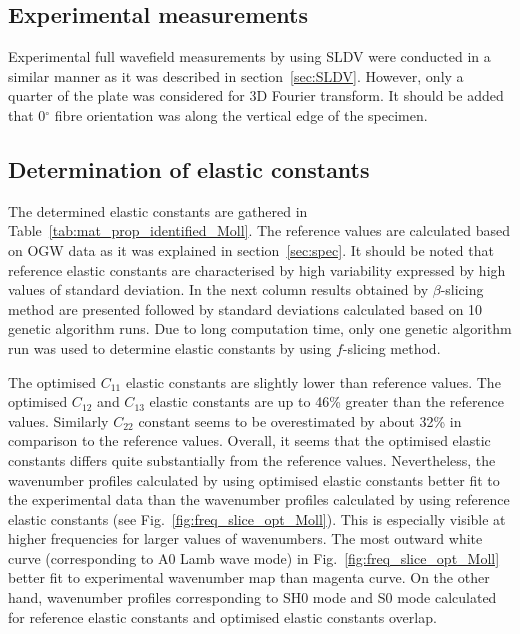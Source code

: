 \documentclass[preprint,12pt]{elsarticle}
\begin{document}
\subsection{Experimental measurements}
Experimental full wavefield measurements by using SLDV were conducted in a similar manner as it was described in section~\ref{sec:SLDV}. 
However, only a quarter of the plate was considered for 3D Fourier transform.
It should be added that 0\(^{\circ}\) fibre orientation was along the vertical edge of the specimen.
\subsection{Determination of elastic constants}
The determined elastic constants are gathered in Table~\ref{tab:mat_prop_identified_Moll}.
The reference values are calculated based on OGW data as it was explained in section~\ref{sec:spec}.
It should be noted that reference elastic constants are characterised by high variability expressed by high values of standard deviation.
In the next column results obtained by $\beta$-slicing method are presented followed by standard deviations calculated based on 10 genetic algorithm runs.
Due to long computation time, only one genetic algorithm run was used to determine elastic constants by using $f$-slicing method.

The optimised $C_{11}$ elastic constants are slightly lower than reference values.
The optimised $C_{12}$ and $C_{13}$ elastic constants are up to 46\% greater than the reference values.
Similarly $C_{22}$ constant seems to be overestimated by about 32\% in comparison to the reference values.
Overall, it seems that the optimised elastic constants differs quite substantially from the reference values.
Nevertheless, the wavenumber profiles calculated by using optimised elastic constants better fit to the experimental data than the wavenumber profiles calculated by using reference elastic constants (see Fig.~\ref{fig:freq_slice_opt_Moll}).
This is especially visible at higher frequencies for larger values of wavenumbers.
The most outward white curve (corresponding to A0 Lamb wave mode) in Fig.~\ref{fig:freq_slice_opt_Moll} better fit to experimental wavenumber map than magenta curve.
On the other hand, wavenumber profiles corresponding to SH0 mode and S0 mode calculated for reference elastic constants and optimised elastic constants overlap.
\end{document}
